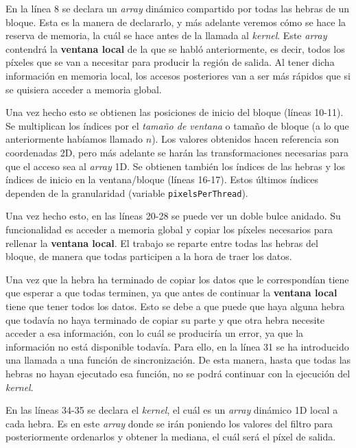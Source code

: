\documentclass[11pt,a4paper]{article}
\begin{document}
En la línea 8 se declara un \textit{array} dinámico compartido por todas las hebras de
un bloque. Esta es la manera de declararlo, y más adelante veremos cómo se hace la reserva
de memoria, la cuál se hace antes de la llamada al \textit{kernel}. Este \textit{array}
contendrá la \textbf{ventana local} de la que se habló anteriormente, es decir, todos los píxeles
que se van a necesitar para producir la región de salida. Al tener dicha información
en memoria local, los accesos posteriores van a ser más rápidos que si se quisiera acceder
a memoria global.

Una vez hecho esto se obtienen las posiciones de inicio del bloque (líneas 10-11). Se
multiplican los índices por el \textit{tamaño de ventana} o tamaño de bloque (a lo que
anteriormente habíamos llamado $n$). Los valores obtenidos hacen referencia son coordenadas
2D, pero más adelante se harán las transformaciones necesarias para que el acceso sea al
\textit{array} 1D. Se obtienen también los índices de las hebras y los índices de inicio en
la ventana/bloque (líneas 16-17). Estos últimos índices dependen de la granularidad (variable
\texttt{pixelsPerThread}).

Una vez hecho esto, en las líneas 20-28 se puede ver un doble bulce anidado. Su funcionalidad
es acceder a memoria global y copiar los píxeles necesarios para rellenar la
\textbf{ventana local}. El trabajo se reparte entre todas las hebras del bloque, de manera
que todas participen a la hora de traer los datos.

Una vez que la hebra ha terminado de copiar los datos que le correspondían tiene que esperar a
que todas terminen, ya que antes de continuar la \textbf{ventana local} tiene que tener
todos los datos. Esto se debe a que puede que haya alguna hebra que todavía no haya terminado
de copiar su parte y que otra hebra necesite acceder a esa información, con lo cuál se produciría
un error, ya que la información no está disponible todavía. Para ello, en la línea 31 se ha
introducido una llamada a una función de sincronización. De esta manera, hasta que todas las
hebras no hayan ejecutado esa función, no se podrá continuar con la ejecución del
\textit{kernel}.

En las líneas 34-35 se declara el \textit{kernel}, el cuál es un \textit{array} dinámico
1D local a cada hebra. Es en este \textit{array} donde se irán poniendo los valores del filtro
para posteriormente ordenarlos y obtener la mediana, el cuál será el píxel de salida.
\end{document}
